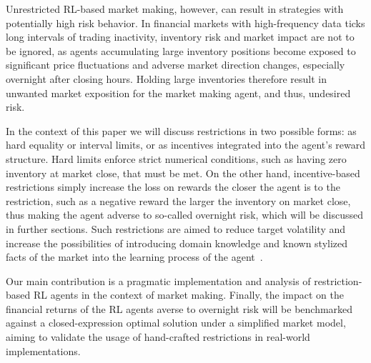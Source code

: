 Unrestricted RL-based market making, however, can result in strategies with potentially high risk behavior.
In financial markets with high-frequency data ticks long intervals of trading inactivity, inventory risk and market impact are not to be ignored,
as agents accumulating large inventory positions become exposed to significant price fluctuations and adverse market direction changes, especially overnight after closing hours.
Holding large inventories therefore result in unwanted market exposition for the market making agent, and thus, undesired risk.

In the context of this paper we will discuss restrictions in two possible forms:
as hard equality or interval limits, or as incentives integrated into the agent's reward structure.
Hard limits enforce strict numerical conditions, such as having zero inventory at market close, that must be met.
On the other hand, incentive-based restrictions simply increase the loss on rewards the closer the agent is to the restriction,
such as a negative reward the larger the inventory on market close, thus making the agent adverse to so-called overnight risk,
which will be discussed in further sections.
Such restrictions are aimed to reduce target volatility and increase the possibilities of introducing domain knowledge
and known stylized facts of the market into the learning process of the agent~\cite{Jerome2022, Selser2021}.

Our main contribution is a pragmatic implementation and analysis of restriction-based RL agents in the context of market making.
Finally, the impact on the financial returns of the RL agents averse to overnight risk will be
benchmarked against a closed-expression optimal solution under a simplified market model,
aiming to validate the usage of hand-crafted restrictions in real-world implementations.
